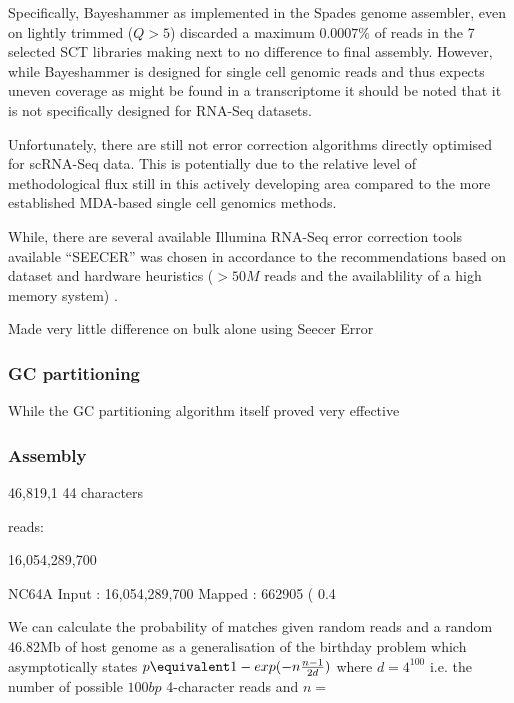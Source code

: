 Specifically, Bayeshammer as implemented in the Spades genome assembler, even on lightly trimmed
(\(Q>5\)) discarded a maximum \(0.0007\%\) of reads in the 7 selected SCT libraries 
making next to no difference to final assembly.  However, while Bayeshammer is designed for
single cell genomic reads and thus expects uneven coverage as might be found in a transcriptome
it should be noted that it is not specifically designed for RNA-Seq datasets.

Unfortunately, there are still not error correction algorithms directly optimised for scRNA-Seq 
data.  This is potentially due to the relative level of methodological flux still in this 
actively developing area compared to the more established MDA-based single cell genomics methods.

While, there are several available Illumina RNA-Seq error correction tools available 
``SEECER'' was chosen in accordance to the recommendations based on dataset and hardware
heuristics (\(>50M\) reads and the availablility of a high memory system) \citep{Macmanes2015}.


Made very little difference on bulk alone using Seecer
Error 


\subsubsection{GC partitioning}

While the GC partitioning algorithm itself proved very effective 


\subsubsection{Assembly}







46,819,1  44 characters

reads:


16,054,289,700

NC64A
Input     : 16,054,289,700
Mapped   :    662905 ( 0.4%

We can calculate the probability of matches given
random reads and a random 46.82Mb of host genome
as a generalisation of the birthday 
problem which asymptotically states
\(p\equivalent 1 - exp(-n\frac{n-1}{2d})\)
where \(d = 4^{100}\) i.e. the number of possible
\(100bp\) 4-character reads and \(n =\) 





